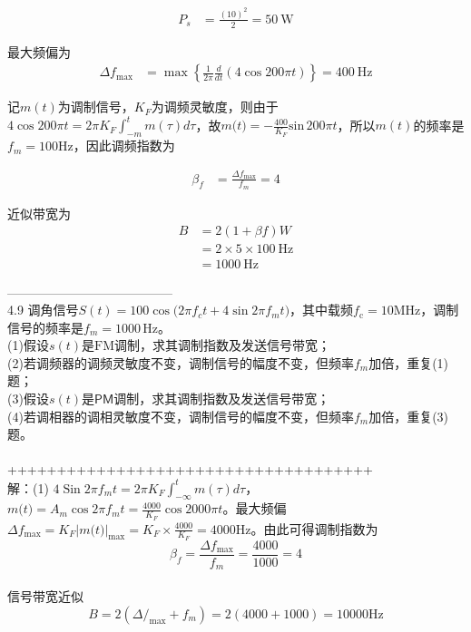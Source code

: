 \documentclass[utf8]{article}
\begin{document}
\begin{align*}
P_s &= \frac{(10)^2}{2} = 50 \ \mathrm{W}
\end{align*}

最大频偏为
\begin{align*}
\Delta f_{\mathrm{max}} &= \max \left\{ \frac{1}{2 \pi} \frac{d}{dt} \left( 4 \cos 200 \pi t \right) \right\} = 400 \ \mathrm{Hz}
\end{align*}

记$m(t)$为调制信号，$K_{F}$为调频灵敏度，则由于$4\cos200\pi t=2\pi K_{F}{\int}_{-m}^{t}m\left(\tau\right)d\tau$，故$m{\bigl(}t{\bigr)}=-{\frac{400}{K_{F}}}\mathrm{sin}\,200\pi t$，所以$m(t)$的频率是$f_{m}=100\mathrm{Hz}$，因此调频指数为

\begin{align*}
\beta_f &= \frac{\Delta f_{\mathrm{max}}}{f_m} = 4 
\end{align*}

近似带宽为
\begin{align*}
B &= 2(1 + \beta f)W \\
&= 2 \times 5 \times 100 \ \mathrm{Hz} \\
&= 1000 \ \mathrm{Hz}
\end{align*}



---------------------------------------\\
4.9 调角信号$S(t)=100\cos\bigl(2\pi f_{c}t+4\sin2\pi f_{m}t\bigr)$，其中载频$f_{\mathrm{c}}\!=\!10\mathrm{MHz}$，调制信号的频率是$f_{m}=1000\,\mathrm{Hz}$。\\
(1)假设$s(t)$是$\mathrm{FM}$调制，求其调制指数及发送信号带宽；\\
(2)若调频器的调频灵敏度不变，调制信号的幅度不变，但频率$f_{m}$加倍，重复(1)题；\\
(3)假设$s(t)$是$\mathsf{P M}$调制，求其调制指数及发送信号带宽；\\
(4)若调相器的调相灵敏度不变，调制信号的幅度不变，但频率$f_{m}$加倍，重复(3)题。\\
\\
+++++++++++++++++++++++++++++++++++++\\
解：(1) $4\operatorname{Sin}2\pi f_{m}t=2\pi K_{F}{\int_{-\infty}^{t}m\left(\tau\right)}d\tau$，$m\bigl(t\bigr)=A_{m}\cos2\pi f_{m}t=\frac{4000}{K_{F}}\cos2000\pi t$。最大频偏$\Delta\!f_{\mathrm{max}}=K_{F}\left|m\big(t\big)\right|_{\mathrm{max}}=K_{F}\times{\frac{4000}{K_{F}}}=4000\mathrm{Hz}$。由此可得调制指数为
$$\beta_{f}=\frac{\Delta f_{\mathrm{max}}}{f_{m}}=\frac{4000}{1000}=4$$\\
信号带宽近似$$B=2\left(\Delta\!\!\slash_{\mathrm{max}}+f_{m}\right)=2\left(4000+1000\right)=10000\mathrm{Hz}$$
\end{document}
